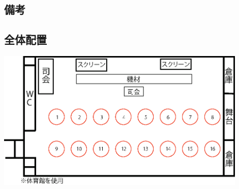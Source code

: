 \subsection{備考}

\subsection{全体配置}
\begin{center}
\includegraphics[width=12cm]{./21/reiout1.eps}
\label{fig:ice}

\end{center}
